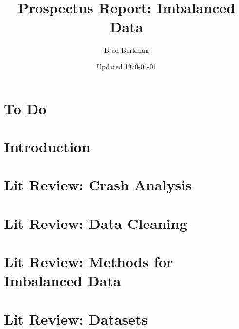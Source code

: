 \documentclass[11pt]{report}
\title{Prospectus Report:  Imbalanced Data}
\author{Brad Burkman}
\date{Updated \today}
\begin{document}
\setlength{\parindent}{20pt}
\begin{spacing}{1.2}
\setcounter{chapter}{-1}


\maketitle
\tableofcontents


\newpage
{}
{}
\printindex


\chapter{To Do}


\chapter{Introduction}



\chapter{Lit Review:  Crash Analysis}




\chapter{Lit Review:  Data Cleaning}



\chapter{Lit Review: Methods for Imbalanced Data}











\chapter{Lit Review:  Datasets}


\end{spacing}
\end{document}
